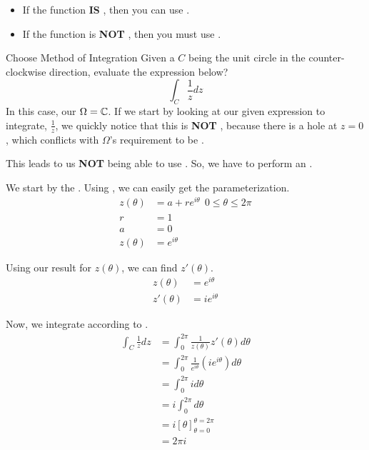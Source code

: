 \begin{itemize}[noitemsep]
\item If the function \textbf{IS} , then you can use .
\item If the function is \textbf{NOT} , then you must use .
\end{itemize}

\begin{example}{Choose Method of Integration}
  Given a  $C$ being the unit circle in the counter-clockwise direction, evaluate the expression below?
  \begin{equation*}
    \int_{C} \frac{1}{z} dz
  \end{equation*}
  \tcblower{}
  In this case, our $\Omega = \operatorname{\mathbb{C}}$.
  If we start by looking at our given expression to integrate, $\frac{1}{z}$, we quickly notice that this is \textbf{NOT} , because there is a hole at $z = 0$, which conflicts with $\Omega$'s requirement to be .

  This leads to us \textbf{NOT} being able to use .
  So, we have to perform an .

  We start by  the .
  Using , we can easily get the parameterization.
  \begin{align*}
    z(\theta) &= a + re^{i \theta} \:\: 0 \leq \theta \leq 2 \pi \\
    r &= 1 \\
    a &= 0 \\
    z(\theta) &= e^{i \theta}
  \end{align*}

  Using our result for $z(\theta)$, we can find $z'(\theta)$.
  \begin{align*}
    z(\theta) &= e^{i \theta} \\
    z'(\theta) &= i e^{i \theta}
  \end{align*}

  Now, we integrate according to .
  \begin{align*}
    \int_{C} \frac{1}{z} dz &= \int_{0}^{2 \pi} \frac{1}{z(\theta)} z'(\theta) d\theta \\
                            &= \int_{0}^{2 \pi} \frac{1}{e^{i \theta}} \left( i e^{i \theta} \right) d\theta \\
                            &= \int_{0}^{2 \pi} i d\theta \\
                            &= i \int_{0}^{2 \pi} d\theta \\
                            &= i {[\theta]}_{\theta = 0}^{\theta = 2 \pi} \\
                            &= 2 \pi i
  \end{align*}
\end{example}


